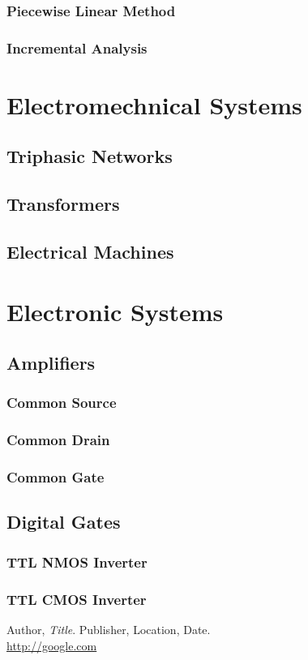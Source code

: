 \documentclass[a4paper]{report}
\begin{document}
\subsection{Piecewise Linear Method}
\subsection{Incremental Analysis}






\chapter{Electromechnical Systems}
\section{Triphasic Networks}
\section{Transformers}
\section{Electrical Machines}

\chapter{Electronic Systems}

\section{Amplifiers}

\subsection{Common Source}


\subsection{Common Drain}


\subsection{Common Gate}


\section{Digital Gates}



\subsection{TTL NMOS Inverter}


\subsection{TTL CMOS Inverter}




\newpage
\begin{thebibliography}{9}

  Author,
  \emph{Title}.
  Publisher, Location, Date.\\
\url {http://google.com}

 
\end{thebibliography}
\end{document}
